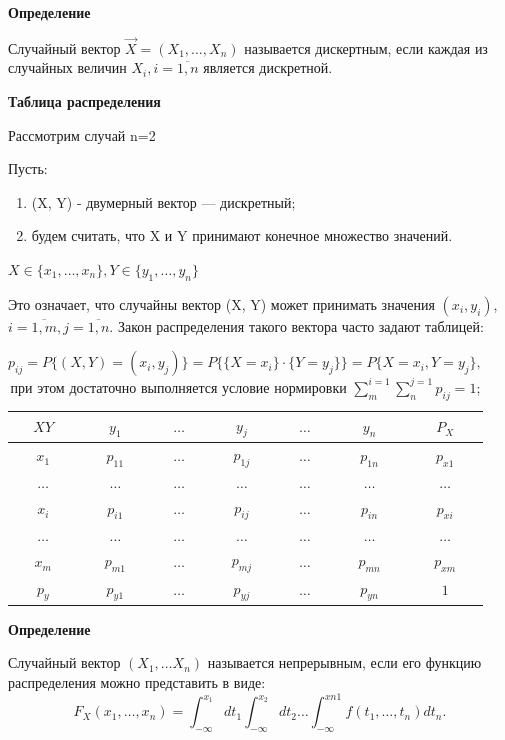 \textbf{Определение}

Случайный вектор $\overrightarrow{X} = (X_1, \dots, X_n)$ называется дискертным, если каждая из случайных величин $X_i, i=\overline{1,n}$ является дискретной.


\textbf{Таблица распределения}

Рассмотрим случай n=2

Пусть: 
\begin{enumerate}[label=\arabic*.]
	\item (X, Y) - двумерный вектор --- дискретный;
	\item будем считать, что X и Y принимают конечное множество значений.  
\end{enumerate}
$X \in \{x_1, \dots, x_n\}, Y \in \{y_1, \dots, y_n\}$

Это означает, что случайны вектор (X, Y) может принимать значения $(x_i, y_i)$, $i=\overline{1,m}, j=\overline{1,n}$. Закон распределения такого вектора часто задают таблицей:
 
\begin{table}[ht!]
	\begin{center}
		\caption{$p_{ij} = P\{(X, Y)=(x_i, y_j)\} = P\{\{X=x_i\} \cdot \{Y=y_j\}\} = P\{X=x_i, Y=y_j\}, $ при этом достаточно выполняется условие нормировки $\sum_{m}^{i=1}\sum_{n}^{j=1}p_{ij}=1$;}
		\label{tbl:sus}
		\begin{tabular}{|c|c|c|c|c|c|c|}
			\hline
			$XY$ & $y_1$ & $\dots$ & $y_j$ & $\dots$ &  $y_n$ & $P_X$\\  \hline
			$x_1$ & $p_{11}$ & $\dots$ & $p_{1j}$ & $\dots$ &  $p_{1n}$ & $p_{x1}$\\  \hline
			$\dots$ & $\dots$ & $\dots$ & $\dots$ & $\dots$ &  $\dots$ & $\dots$\\  \hline
			$x_i$ & $p_{i1}$ & $\dots$ & $p_{ij}$ & $\dots$ &  $p_{in}$ & $p_{xi}$\\  \hline
			$\dots$ & $\dots$ & $\dots$ & $\dots$ & $\dots$ &  $\dots$ & $\dots$\\ \hline
			$x_m$ & $p_{m1}$ & $\dots$ & $p_{mj}$ & $\dots$ &  $p_{mn}$ & $p_{xm}$\\  \hline
			$p_y$ & $p_{y1}$ & $\dots$ & $p_{yj}$ & $\dots$ &  $p_{yn}$ & $1$\\  
			\hline
		\end{tabular}
	\end{center}
\end{table}

\textbf{Определение}

Случайный вектор $(X_1, \dots X_n)$ называется непрерывным, если его функцию распределения можно представить в виде: 
\begin{equation}
	F_X(x_1, \dots, x_n) = \int_{-\infty}^{x_1}dt_1\int_{-\infty}^{x_2}dt_2 \dots
	\int_{-\infty}^{xn1}f(t_1, \dots, t_n)dt_n.
\end{equation}

